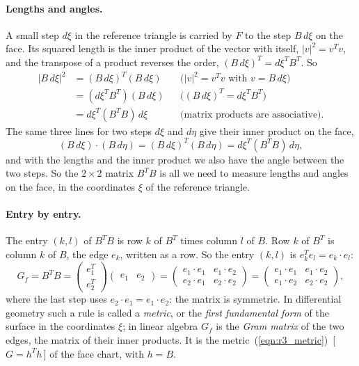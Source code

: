 \paragraph{Lengths and angles.} A small step $d\xi$ in the reference triangle is carried by $F$ to the step $B\, d\xi$ on the face. Its squared length is the inner product of the vector with itself, $|v|^2 = v^T v$, and the transpose of a product reverses the order, $(B\,d\xi)^T = d\xi^T B^T$. So
\begin{align*}
|B\, d\xi|^2 &= (B\, d\xi)^T (B\, d\xi) && \text{($|v|^2 = v^Tv$ with $v = B\,d\xi$)} \\
&= (d\xi^T B^T)(B\, d\xi) && \text{($(B\,d\xi)^T = d\xi^TB^T$)} \\
&= d\xi^T (B^T B)\, d\xi && \text{(matrix products are associative).}
\end{align*}
The same three lines for two steps $d\xi$ and $d\eta$ give their inner product on the face,
\begin{equation*}
(B\, d\xi) \cdot (B\, d\eta) = (B\,d\xi)^T(B\,d\eta) = d\xi^T (B^T B)\, d\eta ,
\end{equation*}
and with the lengths and the inner product we also have the angle between the two steps. So the $2 \times 2$ matrix $B^T B$ is all we need to measure lengths and angles on the face, in the coordinates $\xi$ of the reference triangle.

\paragraph{Entry by entry.} The entry $(k, l)$ of $B^TB$ is row $k$ of $B^T$ times column $l$ of $B$. Row $k$ of $B^T$ is column $k$ of $B$, the edge $e_k$, written as a row. So the entry $(k,l)$ is $e_k^T e_l = e_k \cdot e_l$:
\begin{equation}
\label{eqn:metric}
G_f = B^T B = \begin{pmatrix} e_1^T \\ e_2^T \end{pmatrix} \begin{pmatrix} e_1 & e_2 \end{pmatrix} = \begin{pmatrix} e_1 \cdot e_1 & e_1 \cdot e_2 \\ e_2 \cdot e_1 & e_2 \cdot e_2 \end{pmatrix} = \begin{pmatrix} e_1 \cdot e_1 & e_1 \cdot e_2 \\ e_1 \cdot e_2 & e_2 \cdot e_2 \end{pmatrix},
\end{equation}
where the last step uses $e_2 \cdot e_1 = e_1 \cdot e_2$: the matrix is symmetric. In differential geometry such a rule is called a \emph{metric}, or the \emph{first fundamental form} of the surface in the coordinates $\xi$; in linear algebra $G_f$ is the \emph{Gram matrix} of the two edges, the matrix of their inner products. It is the metric~(\ref{eqn:r3_metric})~[\,$G = h^Th$\,] of the face chart, with $h = B$.

